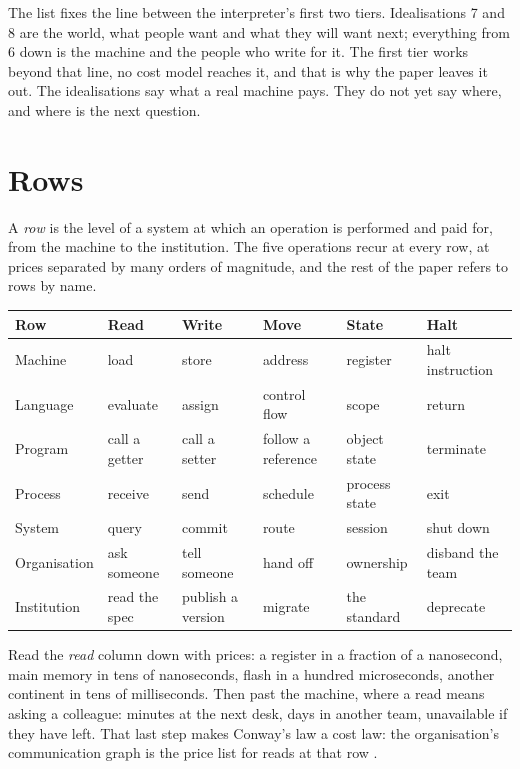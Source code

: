 \documentclass[11pt,oneside]{article}
\theoremstyle{definition}
\theoremstyle{remark}
\begin{document}
The list fixes the line between the interpreter's first two tiers. Idealisations 7 and 8
are the world, what people want and what they will want next; everything from 6 down is
the machine and the people who write for it. The first tier works beyond that line, no
cost model reaches it, and that is why the paper leaves it out. The idealisations say what
a real machine pays. They do not yet say where, and where is the next question.

\section{Rows}\label{sec:rungs}
A \emph{row} is the level of a system at which an operation is performed and paid for,
from the machine to the institution. The five operations recur at every row, at prices
separated by many orders of magnitude, and the rest of the paper refers to rows by name.

\begin{center}
\small
\begin{longtable}{@{}p{}p{}p{}p{}p{}p{}@{}}
\toprule
\textbf{Row} & \textbf{Read} & \textbf{Write} & \textbf{Move} & \textbf{State} &
\textbf{Halt} \\
\midrule
\endhead
Machine & load & store & address & register & halt instruction \\
\addlinespace
Language & evaluate & assign & control flow & scope & return \\
\addlinespace
Program & call a getter & call a setter & follow a reference & object state & terminate \\
\addlinespace
Process & receive & send & schedule & process state & exit \\
\addlinespace
System & query & commit & route & session & shut down \\
\addlinespace
Organisation & ask someone & tell someone & hand off & ownership & disband the team \\
\addlinespace
Institution & read the spec & publish a version & migrate & the standard & deprecate \\
\bottomrule
\end{longtable}
\end{center}

Read the \emph{read} column down with prices: a register in a fraction of a nanosecond,
main memory in tens of nanoseconds, flash in a hundred microseconds, another continent in
tens of milliseconds. Then past the machine, where a read means asking a colleague: minutes
at the next desk, days in another team, unavailable if they have left. That last step makes
Conway's law a cost law: the organisation's communication graph is the price list for
reads at that row \cite{conway1968}.
\end{document}
